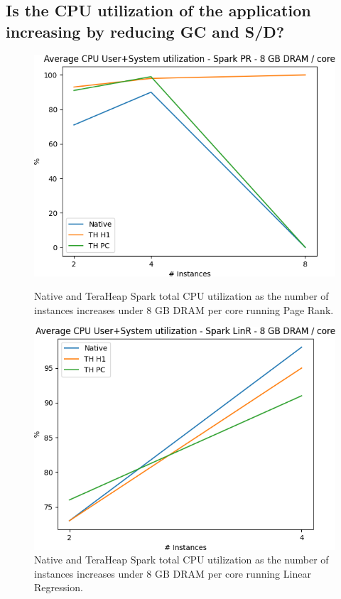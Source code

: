 \subsection{Is the CPU utilization of the application increasing by reducing GC and S/D?}

\begin{figure}[thbp]
        \centering
        \includegraphics[width=\linewidth]{./fig/PR_64_UTIL.png}
    \caption{Native and TeraHeap Spark total CPU utilization
        as the number of instances increases under 8 GB DRAM per core running Page Rank.}
\label{fig:pr_64_util}
        \includegraphics[width=\linewidth]{./fig/LINR_64_UTIL.png}
    \caption{Native and TeraHeap Spark total CPU utilization
        as the number of instances increases under 8 GB DRAM per core running Linear Regression.}
                \label{fig:linr_64_util}
\end{figure}

